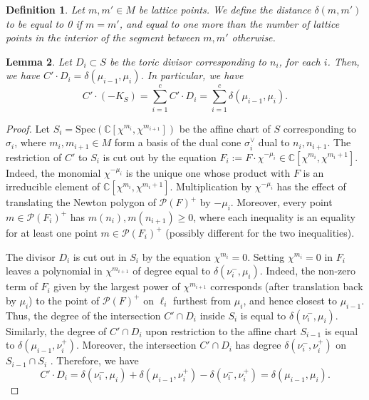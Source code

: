 \documentclass[12pt]{amsart}
\def\cP{\mathcal{P}}
\newtheorem{definition}{Definition}[section]
\newtheorem{lemma}[definition]{Lemma}
\begin{document}
\begin{definition}
       Let $m,m'\in M$ be lattice points. We define the \emph{distance} $\delta(m,m')$ to be equal to 0 if $m=m'$, and equal to one more than the number of lattice points in the interior of the segment between $m,m'$ otherwise.
\end{definition}


   \begin{lemma}\label{degree_perimeter}
     Let $D_i\subset S$ be the toric divisor corresponding to $n_i$, for each $i$. Then, we have $C'\cdot D_i=\delta(\mu_{i-1},\mu_{i})$. In particular, we have
     \begin{equation*}
     C'\cdot (-K_S)=\sum_{i=1}^c C'\cdot D_i=\sum_{i=1}^c \delta(\mu_{i-1},\mu_{i}).
     \end{equation*}
     
   \end{lemma}

   \begin{proof}
       Let $S_i=\text{Spec}(\mathbb{C}[\chi^{m_i},\chi^{m_{i+1}}])$ be the affine chart of $S$ corresponding to $\sigma_i$, where $m_i,m_{i+1}\in M$ form a basis of the dual cone $\sigma_i^{\vee}$ dual to $n_i,n_{i+1}$. The restriction of $C'$ to $S_i$ is cut out by the equation $F_i:=F\cdot \chi^{-\mu_i}\in \mathbb{C}[\chi^{m_i},\chi^{m_{i}+1}]$. Indeed, the monomial $\chi^{-\mu_i}$ is the unique one whose product with $F$ is an irreducible element of $\mathbb{C}[\chi^{m_i},\chi^{m_{i}+1}]$. Multiplication by $\chi^{-\mu_i}$ has the effect of translating the Newton polygon of $\cP(F)^+$ by $-\mu_i$. Moreover, every point $m\in\cP(F_i)^+$ has $m(n_i),m(n_{i+1})\ge 0$, where each inequality is an equality for at least one point $m\in \cP(F_i)^+$ (possibly different for the two inequalities).
       
       The divisor $D_i$ is cut out in $S_i$ by the equation $\chi^{m_{i}}=0$. Setting $\chi^{m_i}=0$ in $F_i$ leaves a polynomial in $\chi^{m_{i+1}}$ of degree equal to $\delta(\nu^{-}_{i},\mu_i)$. Indeed, the non-zero term of $F_i$ given by the largest power of $\chi^{m_{i+1}}$ corresponds (after translation back by $\mu_i$) to the point of $\cP(F)^+$ on $\ell_i$ furthest from $\mu_i$, and hence closest to $\mu_{i-1}$. Thus, the degree of the intersection $C'\cap D_i$ inside $S_i$ is equal to $\delta(\nu^{-}_{i},\mu_i)$. Similarly, the degree of $C'\cap D_i$ upon restriction to the affine chart $S_{i-1}$ is equal to $\delta(\mu_{i-1},\nu^{+}_{i})$. Moreover, the intersection $C'\cap D_i$ has degree $\delta(\nu^{-}_{i},\nu^{+}_{i})$ on $S_{i-1}\cap S_i$ . Therefore, we have
       \begin{equation*}
           C'\cdot D_i=\delta(\nu^{-}_{i},\mu_i)+\delta(\mu_{i-1},\nu^{+}_{i})-\delta(\nu^{-}_{i},\nu^{+}_{i})=\delta(\mu_{i-1},\mu_{i}).
       \end{equation*}
   \end{proof}
\end{document}
